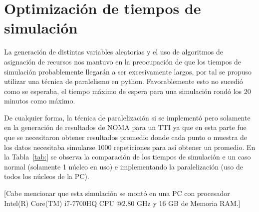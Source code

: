 \section{Optimización de tiempos de simulación}

La generación de distintas variables aleatorias y el uso de algoritmos de asignación de recursos nos mantuvo en la preocupación de que los tiempos de simulación probablemente llegarán a ser excesivamente largos, por tal se propuso utilizar una técnica de paralelismo en python. Favorablemente esto no sucedió como se esperaba, el tiempo máximo de espera para una simulación rondó los 20 minutos como máximo.\newline

De cualquier forma, la técnica de paralelización si se implementó pero solamente en la generación de resultados de NOMA para un TTI ya que en esta parte fue que se necesitaron obtener resultados promedio donde cada punto o muestra de los datos necesitaba simularse 1000 repeticiones para así obtener un promedio. En la Tabla~\ref{tab:} se observa la comparación de los tiempos de simulación e un caso normal (solamente 1 núcleo en uso) e implementando la paralelización (uso de todos los núcleos de la PC).\newline

[Cabe mencionar que esta simulación se montó en una PC con procesador Intel(R) Core(TM) i7-7700HQ CPU @2.80 GHz y 16 GB de Memoria RAM.]

